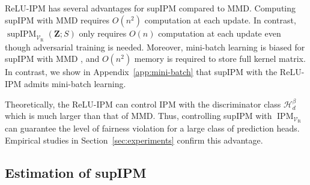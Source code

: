 \documentclass{article} %
\begin{document}
ReLU-IPM has several advantages for supIPM compared to MMD. 
Computing supIPM with MMD requires $O(n^2)$ computation at each update.
In contrast, $\operatorname{supIPM}_{\mathcal{V}_{\mathrm{R}}}(\mathbf{Z};S)$ only requires $O(n)$ computation at each update
even though adversarial training is needed.
Moreover, mini-batch learning is biased for supIPM with MMD \citep{lee2026fair}, and  
$O(n^2)$ memory is required to store full kernel matrix. In contrast, we show in Appendix~\ref{app:mini-batch} that supIPM with the ReLU-IPM admits mini-batch learning.

Theoretically, the ReLU-IPM can control IPM with the discriminator class $\mathcal{H}_{d}^{\beta}$ which is much larger than that of MMD. Thus, controlling supIPM with $\operatorname{IPM}_{\mathcal{V}_{\mathrm{R}}}$
can guarantee the level of fairness violation for a large class of prediction heads. Empirical studies in Section~\ref{sec:experiments} confirm this advantage.

\subsection{Estimation of supIPM}
\label{sec:supipm-estimation}
\end{document}
